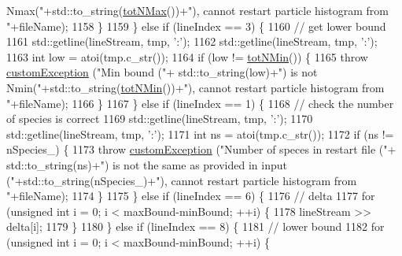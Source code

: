 \begin{DoxyCode}
{       Nmax("}+std::to\_string(\hyperlink{classsim_system_aee2c65ecb43a35c0c4d070cdb45f7dc0}{totNMax}())+\textcolor{stringliteral}{"), cannot restart particle histogram from "}+fileName);
1158                 \}
1159             \} \textcolor{keywordflow}{else} \textcolor{keywordflow}{if} (lineIndex == 3) \{
1160                 \textcolor{comment}{// get lower bound}
1161                 std::getline(lineStream, tmp, \textcolor{charliteral}{':'});
1162                 std::getline(lineStream, tmp, \textcolor{charliteral}{':'});
1163                 \textcolor{keywordtype}{int} low = atoi(tmp.c\_str());
1164                 \textcolor{keywordflow}{if} (low != \hyperlink{classsim_system_af10842e0eaa638373b8717c87b47e6bc}{totNMin}()) \{
1165                     \textcolor{keywordflow}{throw} \hyperlink{classcustom_exception}{customException} (\textcolor{stringliteral}{"Min bound ("}+ std::to\_string(low)+\textcolor{stringliteral}{") is not
       Nmin("}+std::to\_string(\hyperlink{classsim_system_af10842e0eaa638373b8717c87b47e6bc}{totNMin}())+\textcolor{stringliteral}{"), cannot restart particle histogram from "}+fileName);
1166                 \}
1167             \} \textcolor{keywordflow}{else} \textcolor{keywordflow}{if} (lineIndex == 1) \{
1168                 \textcolor{comment}{// check the number of species is correct}
1169                 std::getline(lineStream, tmp, \textcolor{charliteral}{':'});
1170                 std::getline(lineStream, tmp, \textcolor{charliteral}{':'});
1171                 \textcolor{keywordtype}{int} ns = atoi(tmp.c\_str());
1172                 \textcolor{keywordflow}{if} (ns != nSpecies\_) \{
1173                     \textcolor{keywordflow}{throw} \hyperlink{classcustom_exception}{customException} (\textcolor{stringliteral}{"Number of speces in restart file ("}+ 
      std::to\_string(ns)+\textcolor{stringliteral}{") is not the same as provided in input ("}+std::to\_string(nSpecies\_)+\textcolor{stringliteral}{"), cannot restart particle
       histogram from "}+fileName);
1174                 \}
1175             \} \textcolor{keywordflow}{else} \textcolor{keywordflow}{if} (lineIndex == 6) \{
1176                 \textcolor{comment}{// delta}
1177                 \textcolor{keywordflow}{for} (\textcolor{keywordtype}{unsigned} \textcolor{keywordtype}{int} i = 0; i < maxBound-minBound; ++i) \{
1178                     lineStream >> delta[i];
1179                 \}
1180             \} \textcolor{keywordflow}{else} \textcolor{keywordflow}{if} (lineIndex == 8) \{
1181                 \textcolor{comment}{// lower bound}
1182                 \textcolor{keywordflow}{for} (\textcolor{keywordtype}{unsigned} \textcolor{keywordtype}{int} i = 0; i < maxBound-minBound; ++i) \{

\end{DoxyCode}
